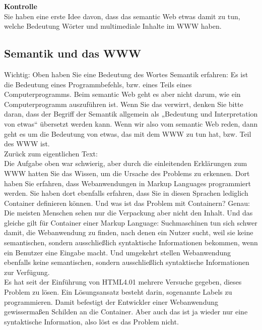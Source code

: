 \textbf{Kontrolle}\\

Sie haben eine erste Idee davon, dass das semantic Web etwas damit zu tun, welche Bedeutung Wörter und multimediale Inhalte im WWW haben.

\subsection{Semantik und das WWW}

Wichtig: Oben haben Sie eine Bedeutung des Wortes Semantik erfahren: Es ist die Bedeutung eines Programmbefehls, bzw. eines Teils eines Computerprogramms. Beim semantic Web geht es aber nicht darum, wie ein Computerprogramm auszuführen ist. Wenn Sie das verwirrt, denken Sie bitte daran, dass der Begriff der Semantik allgemein als „Bedeutung und Interpretation von etwas“ übersetzt werden kann. Wenn wir also vom semantic Web reden, dann geht es um die Bedeutung von etwas, das mit dem WWW zu tun hat, bzw. Teil des WWW ist.\\

Zurück zum eigentlichen Text:\\

Die Aufgabe oben war schwierig, aber durch die einleitenden Erklärungen zum WWW hatten Sie das Wissen, um die Ursache des Problems zu erkennen. Dort haben Sie erfahren, dass Webanwendungen in Markup Languages programmiert werden. Sie haben dort ebenfalls erfahren, dass Sie in diesen Sprachen lediglich Container definieren können. Und was ist das Problem mit Containern? Genau: Die meisten Menschen sehen nur die Verpackung aber nicht den Inhalt. Und das gleiche gilt für Container einer Markup Language: Suchmaschinen tun sich schwer damit, die Webanwendung zu finden, nach denen ein Nutzer sucht, weil sie keine semantischen, sondern ausschließlich syntaktische Informationen bekommen, wenn ein Benutzer eine Eingabe macht. Und umgekehrt stellen Webanwendung ebenfalls keine semantischen, sondern ausschließlich syntaktische Informationen zur Verfügung.\\

Es hat seit der Einführung von HTML4.01 mehrere Versuche gegeben, dieses Problem zu lösen. Ein Lösungsansatz besteht darin, sogenannte Labels zu programmieren. Damit befestigt der Entwickler einer Webanwendung gewissermaßen Schilden an die Container. Aber auch das ist ja wieder nur eine syntaktische Information, also löst es das Problem nicht.\\

